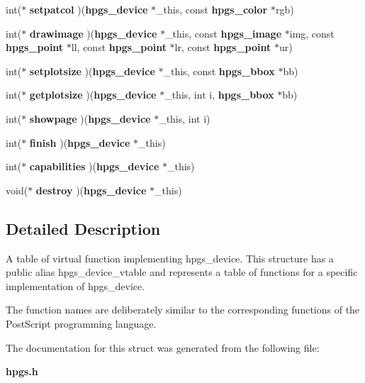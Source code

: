 \begin{DoxyCompactItemize}
\item 
int($\ast$ {\bfseries setpatcol} )({\bf hpgs\_\-device} $\ast$\_\-this, const {\bf hpgs\_\-color} $\ast$rgb)\label{structhpgs__device__vtable__st_aef383649215701a43c5e589fe5070b11}

\item 
int($\ast$ {\bfseries drawimage} )({\bf hpgs\_\-device} $\ast$\_\-this, const {\bf hpgs\_\-image} $\ast$img, const {\bf hpgs\_\-point} $\ast$ll, const {\bf hpgs\_\-point} $\ast$lr, const {\bf hpgs\_\-point} $\ast$ur)\label{structhpgs__device__vtable__st_a5dd8b6dfd8cc38201f337b1755a9f833}

\item 
int($\ast$ {\bfseries setplotsize} )({\bf hpgs\_\-device} $\ast$\_\-this, const {\bf hpgs\_\-bbox} $\ast$bb)\label{structhpgs__device__vtable__st_a731e06a06d4693c043b54148f6774d5a}

\item 
int($\ast$ {\bfseries getplotsize} )({\bf hpgs\_\-device} $\ast$\_\-this, int i, {\bf hpgs\_\-bbox} $\ast$bb)\label{structhpgs__device__vtable__st_ac62d3a20b9edaa607dde29a6851908ef}

\item 
int($\ast$ {\bfseries showpage} )({\bf hpgs\_\-device} $\ast$\_\-this, int i)\label{structhpgs__device__vtable__st_aec74873ea699dfc85f6e829c9541692b}

\item 
int($\ast$ {\bfseries finish} )({\bf hpgs\_\-device} $\ast$\_\-this)\label{structhpgs__device__vtable__st_a0c06346b783d52d7eccf575ae7cda5bd}

\item 
int($\ast$ {\bfseries capabilities} )({\bf hpgs\_\-device} $\ast$\_\-this)\label{structhpgs__device__vtable__st_a2e5b01f48058722e3350a91c3d9468d3}

\item 
void($\ast$ {\bfseries destroy} )({\bf hpgs\_\-device} $\ast$\_\-this)\label{structhpgs__device__vtable__st_a499ef5eb1d26c04b87a701384a0c3292}

\end{DoxyCompactItemize}


\subsection{Detailed Description}
A table of virtual function implementing {\ttfamily hpgs\_\-device}. This structure has a public alias {\ttfamily hpgs\_\-device\_\-vtable} and represents a table of functions for a specific implementation of {\ttfamily hpgs\_\-device}.

The function names are deliberately similar to the corresponding functions of the PostScript programming language. 

The documentation for this struct was generated from the following file:\begin{DoxyCompactItemize}
\item 
{\bf hpgs.h}\end{DoxyCompactItemize}
